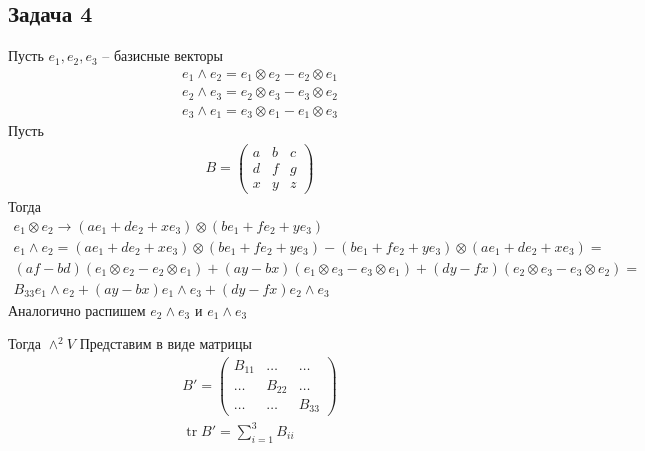 \subsection*{Задача 4}
Пусть $e_1,e_2,e_3$ -- базисные векторы
\begin{gather*}
	e_1 \land e_2 = e_1 \otimes e_2 - e_2 \otimes e_1\\
	e_2 \land e_3 = e_2 \otimes e_3 - e_3 \otimes e_2\\
	e_3 \land e_1 = e_3 \otimes e_1 - e_1 \otimes e_3
\end{gather*}
Пусть 
\begin{gather*}
B = 
\begin{pmatrix}
	a & b & c\\
	d & f & g\\
	x & y & z
\end{pmatrix}
\end{gather*}
Тогда
\begin{gather*}
	e_1 \otimes e_2 \rightarrow (ae_1 + de_2 + xe_3) \otimes (be_1 + fe_2 + ye_3)\\
	e_1 \land e_2 = (ae_1 + de_2 + xe_3) \otimes (be_1 + fe_2 + ye_3) - (be_1 + fe_2 + ye_3) \otimes (ae_1 + de_2 + xe_3) =\\
	(af - bd)(e_1 \otimes e_2 - e_2 \otimes e_1) + (ay - bx)(e_1 \otimes e_3 - e_3 \otimes e_1) + (dy - fx)(e_2 \otimes e_3 - e_3 \otimes e_2) =\\
	B_{33} e_1 \land e_2 + (ay - bx)e_1 \land e_3 + (dy - fx)e_2 \land e_3
\end{gather*}
Аналогично распишем $e_2 \land e_3$ и $e_1 \land e_3$\\
\begin{comment}
\begin{gather*}
e_2 \land e_3 = (bg - cf)(e_1 \otimes e_2 - e_2 \otimes e_1) + (bz - cy)(e_1 \otimes e_3 - e_3 \otimes e_1) + (fz - gy)(e_2 \otimes e_3 - e_3 \otimes e_2)
\end{gather*}
И
\begin{gather*}
e_1 \land e_3 = (az - cx)(e_1 \otimes e_2 - e_2 \otimes e_1) + (bz - cy)(e_1 \otimes e_3 - e_3 \otimes e_1) + (fz - gy)(e_2 \otimes e_3 - e_3 \otimes e_2)
\end{gather*}
\end{comment}
Тогда $\land^2V$ Представим в виде матрицы
\begin{gather*}
B'= 
\begin{pmatrix}
	B_{11} & \ldots & \ldots\\
	\ldots & B_{22} & \ldots\\
	\ldots & \ldots & B_{33}
\end{pmatrix}\\
\operatorname{tr}B' = \sum\limits_{i = 1}^{3} B_{ii}
\end{gather*}
